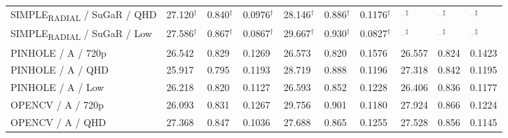 \documentclass[a4paper,landscape]{article}
\begin{document}
\begin{center}
\begin{tabularx}{0.99\linewidth}{>{\raggedright\arraybackslash}p{5.0cm}YYYYYYYYY}
SIMPLE\textsubscript{RADIAL} / SuGaR / QHD & 27.120$^{\dagger}$ & 0.840$^{\dagger}$ & 0.0976$^{\dagger}$ & 28.146$^{\dagger}$ & 0.886$^{\dagger}$ & 0.1176$^{\dagger}$ & \textcolor{darkgray}{--}$^{\ddagger}$ & \textcolor{darkgray}{--}$^{\ddagger}$ & \textcolor{darkgray}{--}$^{\ddagger}$ \\
SIMPLE\textsubscript{RADIAL} / SuGaR / Low & 27.586$^{\dagger}$ & 0.867$^{\dagger}$ & 0.0867$^{\dagger}$ & 29.667$^{\dagger}$ & 0.930$^{\dagger}$ & 0.0827$^{\dagger}$ & \textcolor{darkgray}{--}$^{\ddagger}$ & \textcolor{darkgray}{--}$^{\ddagger}$ & \textcolor{darkgray}{--}$^{\ddagger}$ \\
PINHOLE / A / 720p & 26.542 & 0.829 & 0.1269 & 26.573 & 0.820 & 0.1576 & 26.557 & 0.824 & 0.1423 \\
PINHOLE / A / QHD & 25.917 & 0.795 & 0.1193 & 28.719 & 0.888 & 0.1196 & 27.318 & 0.842 & 0.1195 \\
PINHOLE / A / Low & 26.218 & 0.820 & 0.1127 & 26.593 & 0.852 & 0.1228 & 26.406 & 0.836 & 0.1177 \\
OPENCV / A / 720p & 26.093 & 0.831 & 0.1267 & 29.756 & 0.901 & 0.1180 & 27.924 & 0.866 & 0.1224 \\
OPENCV / A / QHD & 27.368 & 0.847 & 0.1036 & 27.688 & 0.865 & 0.1255 & 27.528 & 0.856 & 0.1145 \\

\end{tabularx}
\end{center}
\end{document}
